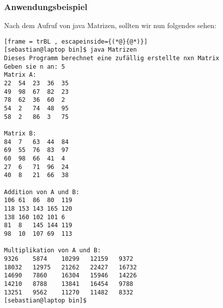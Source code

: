 \subsubsection{Anwendungsbeispiel}
Nach dem Aufruf von java Matrizen, sollten wir nun folgendes sehen:
\begin{lstlisting}[frame = trBL , escapeinside={(*@}{@*)}]
[sebastian@laptop bin]$ java Matrizen 
Dieses Programm berechnet eine zufällig erstellte nxn Matrix
Geben sie n an: 5
Matrix A:
22	54	23	36	35	
49	98	67	82	23	
78	62	36	60	2	
54	2	74	48	95	
58	2	86	3	75	

Matrix B:
84	7	63	44	84	
69	55	76	83	97	
60	98	66	41	4	
27	6	71	96	24	
40	8	21	66	38	

Addition von A und B:
106	61	86	80	119	
118	153	143	165	120	
138	160	102	101	6	
81	8	145	144	119	
98	10	107	69	113	

Multiplikation von A und B:
9326	5874	10299	12159	9372	
18032	12975	21262	22427	16732	
14690	7860	16304	15946	14226	
14210	8788	13841	16454	9788	
13251	9562	11270	11482	8332
[sebastian@laptop bin]$  
\end{lstlisting}
